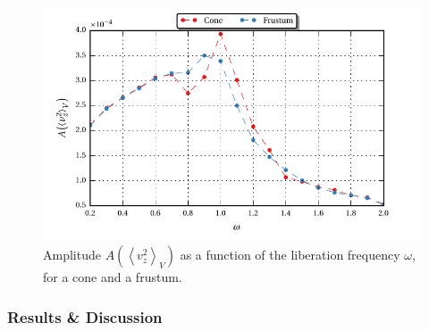 \begin{figure}[!bp]
  \centering
  \includegraphics{gfx/cone/experiment/experiment.pdf}
  \caption{Amplitude $A\left(\left<v^2_z\right>_V\right)$ as a function of the liberation frequency $\omega$,
            for a cone and a frustum.  \label{fig:cone_expseries} }
\end{figure}

\subsubsection{Results \& Discussion}
\label{cone:exp}

